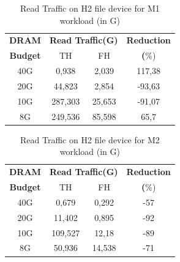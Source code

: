 \begin{table}[h]
\centering
\caption{Read Traffic on H2 file device for M1 workload (in G)}
\label{tab:m1-traffic}
\begin{tabular}{|c|cc|c|}
\hline

\textbf{DRAM} & \multicolumn{2}{c|}{\textbf{Read Traffic(G)}} & \textbf{Reduction} \\
\textbf{Budget} & TH & FH & \textbf(\%)\\
\hline
40G & 0,938 & 2,039 & 117,38 \\
20G & 44,823 & 2,854 & -93,63 \\
10G & 287,303 & 25,653 & -91,07 \\
8G  & 249,536 & 85,598 & 65,7 \\
\hline
\end{tabular}
\end{table}
%


\begin{table}[h]
\centering
\caption{Read Traffic on H2 file device for M2 workload (in G)}
\label{tab:m2-traffic}
\begin{tabular}{|c|cc|c|}
\hline
\textbf{DRAM} & \multicolumn{2}{c|}{\textbf{Read Traffic(G)}} & \textbf{Reduction} \\
\textbf{Budget} & TH & FH & \textbf(\%)\\
\hline
40G & 0,679 & 0,292 & -57 \\ 
20G & 11,402 & 0,895 & -92 \\
10G & 109,527 & 12,18 & -89 \\
8G  & 50,936 & 14,538 & -71 \\
\hline
\end{tabular}
\end{table}

